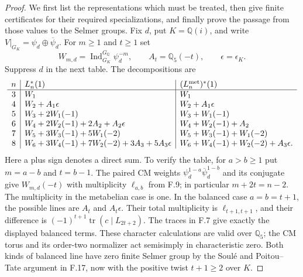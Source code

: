 \begin{proof}
We first list the representations which must be treated, then
give finite certificates for their required specializations, and
finally prove the passage from those values to the Selmer groups.
Fix $d$, put $K=\mathbb Q(i)$, and write
$V|_{G_K}=\psi_d\oplus\overline\psi_d$.
For $m\ge1$ and $t\ge1$ set
\[
 W_{m,d}=\operatorname{Ind}_{G_K}^{G_{\mathbb Q}}\psi_d^{-m},
 \qquad A_t=\mathbb Q_5(-t),\qquad \epsilon=\epsilon_K.
\]
Suppress $d$ in the next table. The decompositions are
\begingroup\small
\[
\begin{array}{c|l|l}
n&L_n^*(1)&(L_n^{\rm met})^*(1)\\\hline
3&W_1&W_1\\
4&W_2+A_1\epsilon&W_2+A_1\epsilon\\
5&W_3+2W_1(-1)&W_3+W_1(-1)\\
6&W_4+2W_2(-1)+2A_2+A_2\epsilon&W_4+W_2(-1)+A_2\\
7&W_5+3W_3(-1)+5W_1(-2)&W_5+W_3(-1)+W_1(-2)\\
8&W_6+3W_4(-1)+7W_2(-2)+3A_3+5A_3\epsilon
 &W_6+W_4(-1)+W_2(-2)+A_3\epsilon .
\end{array}
\]
\endgroup
Here a plus sign denotes a direct sum. To verify the table, for
$a>b\ge1$ put $m=a-b$ and $t=b-1$. The paired CM weights
$\psi_d^{1-a}\overline\psi_d^{1-b}$ and its conjugate give
$W_{m,d}(-t)$ with multiplicity $\ell_{a,b}$ from F.9; in
particular $m+2t=n-2$. The multiplicity in the metabelian case
is one. In the balanced case $a=b=t+1$, the possible lines
are $A_t$ and $A_t\epsilon$. Their total multiplicity is
$\ell_{t+1,t+1}$, and their difference is
$(-1)^{t+1}\operatorname{tr}(c\mid L_{2t+2})$.
The traces in F.7 give exactly the displayed balanced terms.
These character calculations are valid over $\mathbb Q_5$;
the CM torus and its order-two normalizer act semisimply in
characteristic zero. Both kinds of balanced line have zero
finite Selmer group by the Soul\'e and Poitou--Tate argument
in F.17, now with the positive twist $t+1\ge2$ over $K$.


\end{proof}
